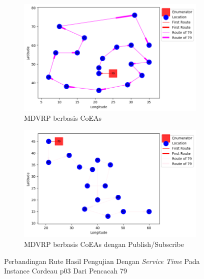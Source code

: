 \begin{figure}[H]
	\centering
	\begin{subfigure}[t]{\textwidth}
		\centering
		\includegraphics[width=\textwidth]{Resources/Images/cordeau_p03_tw/cordeau_p03_tw_79_coes}
		\caption{MDVRP berbasis CoEAs}
		\label{fig:cordeau_p03_tw_79_coes}
	\end{subfigure}
	\begin{subfigure}[t]{\textwidth}
		\centering
		\includegraphics[width=\textwidth]{Resources/Images/cordeau_p03_tw/cordeau_p03_tw_79_pubsub_coes}
		\caption{MDVRP berbasis CoEAs dengan Publish/Subscribe}
		\label{fig:cordeau_p03_tw_79_pubsub_coes}
	\end{subfigure}
	\caption{Perbandingan Rute Hasil Pengujian Dengan \textit{Service Time} Pada Instance Cordeau p03 Dari Pencacah 79}
	\label{fig:cordeau_p03_tw_79}
\end{figure}


